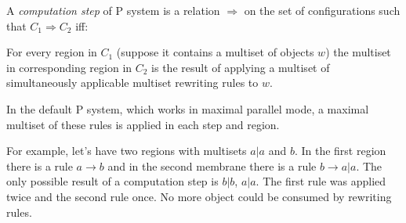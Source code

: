 A {\em computation step} of P system is a relation $\Rightarrow$ on the set of configurations such that $C_1 \Rightarrow C_2$ iff:

For every region in $C_1$ (suppose it contains a multiset of objects $w$) the multiset in corresponding region in $C_2$ is the result of applying a multiset of simultaneously applicable multiset rewriting rules to $w$.

In the default P system, which works in maximal parallel mode, a maximal multiset of these rules is applied in each step and region.

For example, let's have two regions with multisets $a|a$ and $b$. In the first region there is a rule $a\rightarrow b$ and in the second membrane there is a rule $b\rightarrow a|a$. The only possible result of a computation step is $b|b$, $a|a$. The first rule was applied twice and the second rule once. No more object could be consumed by rewriting rules.
